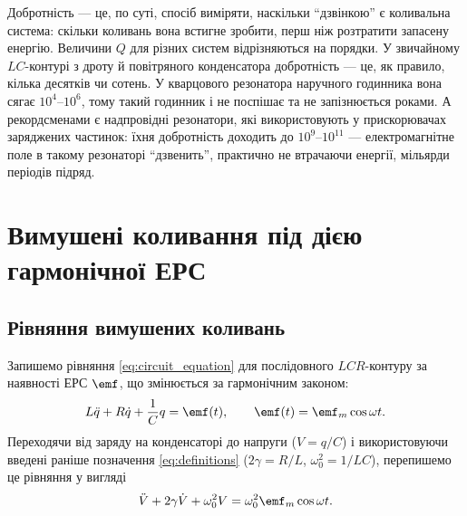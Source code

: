 \begin{Attention}
	Добротність --- це, по суті, спосіб виміряти, наскільки \enquote{дзвінкою} є коливальна система: скільки коливань вона встигне зробити, перш ніж розтратити запасену енергію. Величини $Q$ для різних систем відрізняються на порядки. У звичайному $LC$-контурі з дроту й повітряного конденсатора добротність --- це, як правило, кілька десятків чи сотень. У кварцового резонатора наручного годинника вона сягає $10^{4}$--$10^{6}$, тому такий годинник і не поспішає та не запізнюється роками. А рекордсменами є надпровідні резонатори, які використовують у прискорювачах заряджених частинок: їхня добротність доходить до $10^{9}$--$10^{11}$ --- електромагнітне поле в такому резонаторі \enquote{дзвенить}, практично не втрачаючи енергії, мільярди періодів підряд.
\end{Attention}

\section{Вимушені коливання під дією гармонічної ЕРС}\hypertarget{forced-oscillations}{}

\subsection*{Рівняння вимушених коливань}

Запишемо рівняння \eqref{eq:circuit_equation} для послідовного $LCR$-контуру за наявності ЕРС $\emf$,
що змінюється за гармонічним законом:
\begin{equation}\label{eq:forced_equation}
	L\ddot{q} + R\dot{q} + \frac{1}{C}q = \emf(t), \qquad
	\emf(t) = \emf_m \cos\omega t.
\end{equation}
Переходячи від заряду на конденсаторі до напруги ($V = q/C$) і використовуючи введені раніше позначення \eqref{eq:definitions} ($2\gamma = R/L$, $\omega_0^2 = 1/LC$), перепишемо це рівняння у вигляді
\begin{equation}\label{eq:forced_equation_V}
	\ddot{V} + 2\gamma\dot{V} + \omega_0^2 V = \omega_0^2 \emf_m \cos\omega t.
\end{equation}

